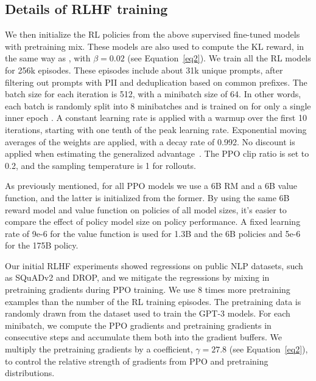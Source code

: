 \documentclass{article}
\begin{document}
\subsection{Details of RLHF training}
We then initialize the RL policies from the above supervised fine-tuned models with pretraining mix. These models are also used to compute the KL reward, in the same way as \citet{stiennon2020learning}, with $\beta=0.02$ (see Equation~\ref{eq2}). We train all the RL models for 256k episodes. These episodes include about 31k unique prompts, after filtering out prompts with PII and deduplication based on common prefixes.
The batch size for each iteration is 512, with a minibatch size of 64. In other words, each batch is randomly split into 8 minibatches and is trained on for only a single inner epoch \citep{schulman2017proximal}. A constant learning rate is applied with a warmup over the first 10 iterations, starting with one tenth of the peak learning rate. Exponential moving averages of the weights are applied, with a decay rate of 0.992. No discount is applied when estimating the generalized advantage~\citep{schulman2016gae}. The PPO clip ratio is set to 0.2, and the sampling temperature is 1 for rollouts.

As previously mentioned, for all PPO models we use a 6B RM and a 6B value function, and the latter is initialized from the former. 
By using the same 6B reward model and value function on policies of all model sizes, it's easier to compare the effect of policy model size on policy performance. A fixed learning rate of 9e-6 for the value function is used for 1.3B and the 6B policies and 5e-6 for the 175B policy. 


Our initial RLHF experiments showed regressions on public NLP datasets,  such as SQuADv2 and DROP, and we mitigate the regressions by mixing in pretraining gradients during PPO training. We use 8 times more pretraining examples than the number of the RL training episodes. The pretraining data is randomly drawn from the dataset used to train the GPT-3 models. For each minibatch, we compute the PPO gradients and pretraining gradients in consecutive steps and accumulate them both into the gradient buffers. We multiply the pretraining gradients by a coefficient, $\gamma=27.8$ (see Equation~\ref{eq2}), to control the relative strength of gradients from PPO and pretraining distributions.
\end{document}
